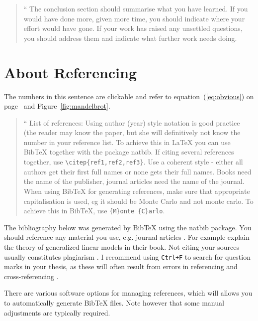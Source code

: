\documentclass[11pt,a4,twosided,singlespacing,titlepagenumber=on]{scrreprt}
\numberwithin{equation}{chapter} %
\theoremstyle{remark}
\newenvironment{myquote}%
{\begin{quote}{\Large{}``}}%
{\ifhmode\unskip\fi{\Large{}''}\end{quote}}
\begin{document}
\begin{myquote}
The conclusion section should summarise what you have learned. If you would have done more, given
more time, you should indicate where your effort would have gone. If your work has raised any unsettled
questions, you should address them and indicate what further work needs doing.
\end{myquote}
\section{About Referencing}
The numbers in this sentence are clickable and refer to equation~(\ref{eq:obvious}) on page~\pageref{eq:obvious} and Figure~\ref{fig:mandelbrot}.

\begin{myquote}
List of references: Using author (year) style notation is good practice (the reader may know the paper, but
she will definitively not know the number in your reference list. To achieve this in LaTeX you can use BibTeX
together with the package natbib. If citing several references together, use \verb|\citep{ref1,ref2,ref3}|. Use
a coherent style - either all authors get their first full names or none gets their full names. Books need the
name of the publisher, journal articles need the name of the journal. When using BibTeX for generating
references, make sure that appropriate capitalisation is used, eg it should be Monte Carlo and not monte
carlo. To achieve this in BibTeX, use \verb|{M}onte {C}arlo|.
\end{myquote}

The bibliography below was generated by BibTeX using the natbib package. You should reference any material you use, e.g. journal articles \citep{cox_regression_1972}. For example \citet{mccullagh_generalized_1989} explain the theory of generalized linear models in their book. Not citing your sources usually constitutes plagiarism \citep{plagiarism}. I recommend using \verb|Ctrl+F| to search for question marks in your thesis, as these will often result from errors in referencing and cross-referencing \citep{nonexistingreference}.

There are various software options for managing references, which will allows you to automatically generate BibTeX files. Note however that some manual adjustments are typically required.
\end{document}
